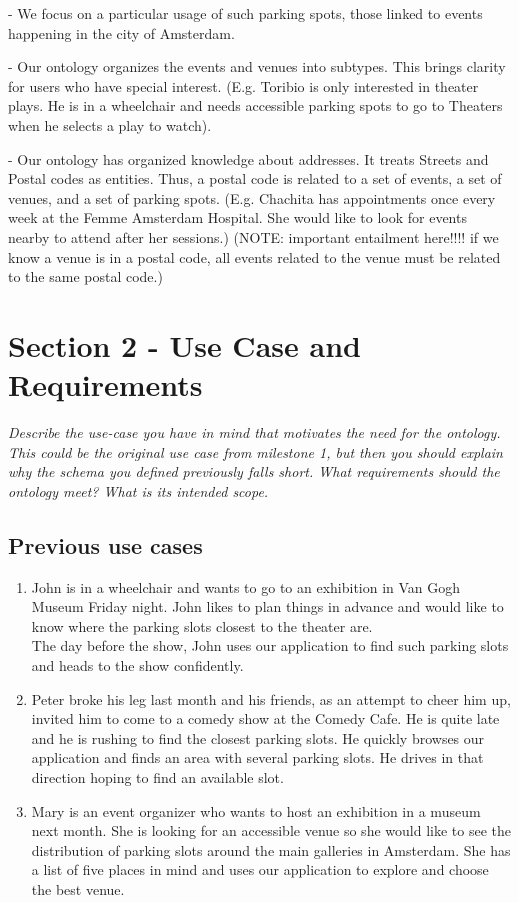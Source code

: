 \documentclass[runningheads,a4paper]{../../StyleFiles/llncs}
\begin{document}
- We focus on a particular usage of such parking spots, those linked to events happening in the city of Amsterdam. 

- Our ontology organizes the events and venues into subtypes. This brings clarity for users who have special interest. (E.g. Toribio is only interested in theater plays. He is in a wheelchair and needs accessible parking spots to go to Theaters when he selects a play to watch).

- Our ontology has organized knowledge about addresses. It treats Streets and Postal codes as entities. Thus, a postal code is related to a set of events, a set of venues, and a set of parking spots. (E.g. Chachita has appointments once every week at the Femme Amsterdam Hospital. She would like to look for events nearby to attend after her sessions.)
(NOTE: important entailment here!!!! if we know a venue is in a postal code, all events related to the venue must be related to the same postal code.)

\section{Section 2 - Use Case and Requirements}
\textit{Describe the use-case you have in mind that motivates the need for the ontology. This could be the original use case from milestone 1, but then you should explain why the schema you defined previously falls short. What requirements should the ontology meet? What is its intended scope.}
\subsection{Previous use cases}
\begin{enumerate}
	\item John is in a wheelchair and wants to go to an exhibition in Van Gogh Museum Friday night. John likes to plan things in advance and would like to know where the parking slots closest to the theater are. \\
	The day before the show, John uses our application to find such parking slots and heads to the show confidently. 
	\item Peter broke his leg last month and his friends, as an attempt to cheer him up, invited him to come to a comedy show at the Comedy Cafe. He is quite late and he is rushing to find the closest parking slots. He quickly browses our application and finds an area with several parking slots. He drives in that direction hoping to find an available slot. 
	\item Mary is an event organizer who wants to host an exhibition in a museum next month. She is looking for an accessible venue so she would like to see the distribution of parking slots around the main galleries in Amsterdam. She has a list of five places in mind and uses our application to explore and choose the best venue.
\end{enumerate}
\end{document}
